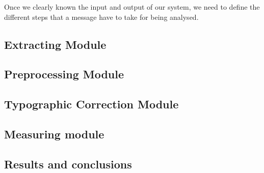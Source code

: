 Once we clearly known the input and output of our system, we need to define the different steps that a message have to take for being analysed.

\subsection{Extracting Module} \label{ssection:extmod}

\subsection{Preprocessing Module} \label{ssection:prepmod}

\subsection{Typographic Correction Module} \label{ssection:typomod}

\subsection{Measuring module} \label{ssection:measmod}

\subsection{Results and conclusions} \label{ssection:resconc}
